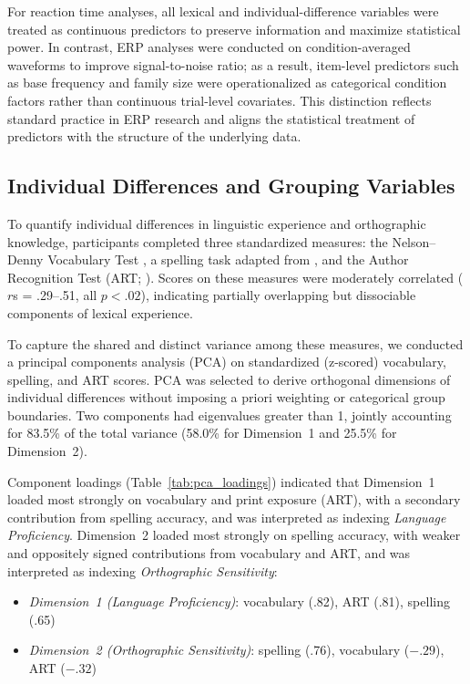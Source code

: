 \documentclass[utf8]{FrontiersinHarvard} %
\begin{document}
For reaction time analyses, all lexical and individual-difference variables were treated as continuous predictors to preserve information and maximize statistical power. In contrast, ERP analyses were conducted on condition-averaged waveforms to improve signal-to-noise ratio; as a result, item-level predictors such as base frequency and family size were operationalized as categorical condition factors rather than continuous trial-level covariates. This distinction reflects standard practice in ERP research and aligns the statistical treatment of predictors with the structure of the underlying data.

\subsection{Individual Differences and Grouping Variables}

To quantify individual differences in linguistic experience and orthographic knowledge, participants completed three standardized measures: the Nelson–Denny Vocabulary Test \citep{nelson1960}, a spelling task adapted from \citet{sawi2016}, and the Author Recognition Test (ART; \citealt{stanovich1989}). Scores on these measures were moderately correlated ($r$s = .29–.51, all $p < .02$), indicating partially overlapping but dissociable components of lexical experience.

To capture the shared and distinct variance among these measures, we conducted a principal components analysis (PCA) on standardized (z-scored) vocabulary, spelling, and ART scores. PCA was selected to derive orthogonal dimensions of individual differences without imposing a priori weighting or categorical group boundaries. Two components had eigenvalues greater than 1, jointly accounting for 83.5\% of the total variance (58.0\% for Dimension~1 and 25.5\% for Dimension~2).

Component loadings (Table~\ref{tab:pca_loadings}) indicated that Dimension~1 loaded most strongly on vocabulary and print exposure (ART), with a secondary contribution from spelling accuracy, and was interpreted as indexing \textit{Language Proficiency}. Dimension~2 loaded most strongly on spelling accuracy, with weaker and oppositely signed contributions from vocabulary and ART, and was interpreted as indexing \textit{Orthographic Sensitivity}:

\begin{itemize}
	\item[-] \textit{Dimension~1 (Language Proficiency)}: vocabulary (.82), ART (.81), spelling (.65)
	\item[-] \textit{Dimension~2 (Orthographic Sensitivity)}: spelling (.76), vocabulary ($- .29$), ART ($- .32$)
\end{itemize}
\end{document}

